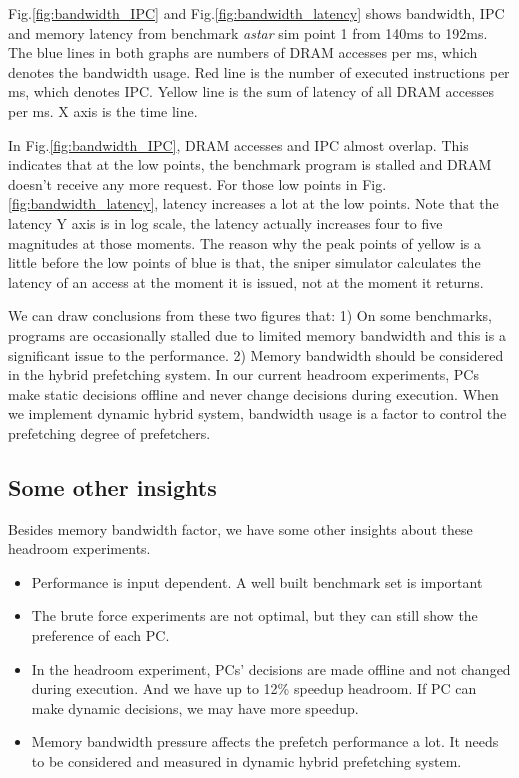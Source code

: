 Fig.\ref{fig:bandwidth_IPC} and Fig.\ref{fig:bandwidth_latency} shows bandwidth, IPC and memory latency from benchmark \emph{astar} sim point 1 from 140ms to 192ms. The blue lines in both graphs are numbers of DRAM accesses per ms, which denotes the bandwidth usage. Red line is the number of executed instructions per ms, which denotes IPC. Yellow line is the sum of latency of all DRAM accesses per ms. X axis is the time line.\par
In Fig.\ref{fig:bandwidth_IPC}, DRAM accesses and IPC almost overlap. This indicates that at the low points, the benchmark program is stalled and DRAM doesn't receive any more request. For those low points in Fig.\ref{fig:bandwidth_latency}, latency increases a lot at the low points. Note that the latency Y axis is in log scale, the latency actually increases four to five magnitudes at those moments. The reason why the peak points of yellow is a little before the low points of blue is that, the sniper simulator calculates the latency of an access at the moment it is issued, not at the moment it returns.\par
 We can draw conclusions from these two figures that: 1) On some benchmarks, programs are occasionally stalled due to limited memory bandwidth and this is a significant issue to the performance. 2) Memory bandwidth should be considered in the hybrid prefetching system.  In our current headroom experiments, PCs make static decisions offline and never change decisions during execution. When we implement dynamic hybrid system, bandwidth usage is a factor to control the prefetching degree of prefetchers. \par


  \subsection{Some other insights}
  \label{sec:otherinsights}
  Besides memory bandwidth factor, we have some other insights about these headroom experiments.
  \begin{itemize}
    \item Performance is input dependent. A well built benchmark set is important
    \item The brute force experiments are not optimal, but they can still show the preference of each PC.
    \item In the headroom experiment, PCs’ decisions are made offline and not changed during execution. And we have up to 12\% speedup headroom. If PC can make dynamic decisions, we may have more speedup.
    \item Memory bandwidth pressure affects the prefetch performance a lot. It needs to be considered and measured in dynamic hybrid prefetching system.
  \end{itemize}

